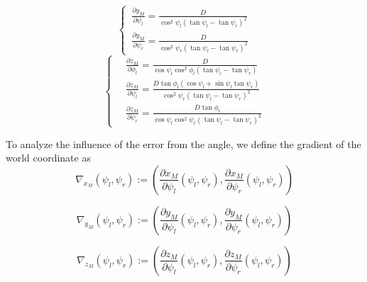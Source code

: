 \documentclass[journal,article,submit,moreauthors,pdftex,10pt,a4paper]{mdpi}
\begin{document}
\begin{equation}
	\left\{ \,
	\begin{aligned}
		\frac{\partial y_M}{\partial \psi_l} = \frac{ D}{\cos^2 \psi_l (\tan \psi_l - \tan \psi_r)^2} \\
		\frac{\partial y_M}{\partial \psi_r} = \frac{D}{\cos^2 \psi_r (\tan \psi_l - \tan \psi_r)^2} 
	\end{aligned}
	\right.	
\end{equation}
\begin{equation}
	\left\{ \,
	\begin{aligned}
		&\frac{ \partial z_M}{ \partial \phi_l} = \frac{D}{ \cos \psi_l \cos^2 \phi_l (\tan \psi_l - \tan \psi_r)} \\
		&\frac{\partial z_M}{\partial \psi_l} = \frac{ D \tan \phi_l(\cos \psi_l + \sin \psi_l \tan \psi_r)}{ \cos^2 \psi_r (\tan \psi_l - \tan \psi_r)^2} \\
		&\frac{ \partial z_M}{ \partial \psi_r} = \frac{ D \tan \phi_l}{ \cos \psi_l \cos^2 \psi_r (\tan \psi_l - \tan \psi_r)^2}
	\end{aligned}
	\right.
\end{equation} 

To analyze the influence of the error from the angle, we define the gradient of the world coordinate as
\begin{equation}
	\nabla_{x_M}(\psi_l, \psi_r):=\left( \frac{\partial x_M}{\partial \psi_l}(\psi_l, \psi_r), \frac{\partial x_M}{\partial \psi_r}(\psi_l, \psi_r)  \right)
\end{equation}

\begin{equation}
	\nabla_{y_M}(\psi_l, \psi_r):=\left( \frac{\partial y_M}{\partial \psi_l}(\psi_l, \psi_r), \frac{\partial y_M}{\partial \psi_r}(\psi_l, \psi_r)  \right)
\end{equation}

\begin{equation}
	\nabla_{z_M}(\psi_l, \psi_r):=\left( \frac{\partial z_M}{\partial \psi_l}(\psi_l, \psi_r), \frac{\partial z_M}{\partial \psi_r}(\psi_l, \psi_r)  \right)
\end{equation}
\end{document}
